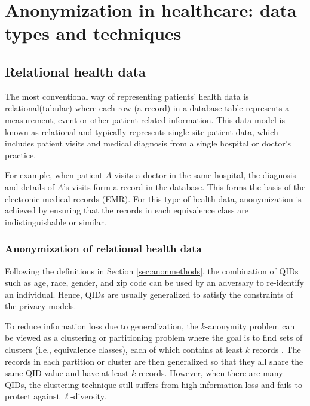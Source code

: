\documentclass{bioinfo}
\newcommand{\mpara}[1]{\medskip\noindent{\bf #1}}
\begin{document}
\section{ Anonymization in healthcare: data types and techniques}
\label{sec:diffdatatypes}
\subsection{Relational health data} 
The most conventional way of representing patients' health data is relational(tabular) where each row (a record) in a database table represents a measurement, event or other patient-related information. This data model is known as relational and typically represents single-site patient data, which includes patient visits and medical diagnosis from a single hospital or doctor's practice.

For example, when patient $A$ visits a doctor in the same hospital, the diagnosis and details of $A$'s visits form a record in the database. This forms the basis of the electronic medical records (EMR). For this type of health data, anonymization is achieved by ensuring that the records in each equivalence class are indistinguishable or similar.


\subsubsection{Anonymization of relational health data}
\label{sec:structuredanon}
\mpara{Anonymization based on generalization.}
Following the definitions in Section \ref{sec:anonmethods}, the combination of QIDs such as age, race, gender, and zip code can be used by an adversary to re-identify an individual. Hence, QIDs are usually generalized to satisfy the constraints of the privacy models.

To reduce information loss due to generalization, the $k$-anonymity problem can be viewed as a clustering or partitioning problem where the goal is to find sets of clusters (i.e., equivalence classes), each of which contains at least $k$ records \cite{cite6byun2007efficient, cite63agrawal2003information, cite68dong2005reference, cite733mortazavi2014fast, cite735nergiz2008multirelational}. 
The records in each partition or cluster are then generalized so that they all share the same QID value and have at least $k$-records. However, when there are many QIDs, the clustering technique still suffers from high information loss \cite{cite723aggarwal2008privacy, cite734narayanan2008robust} and fails to protect against $\ell$-diversity.
\end{document}

